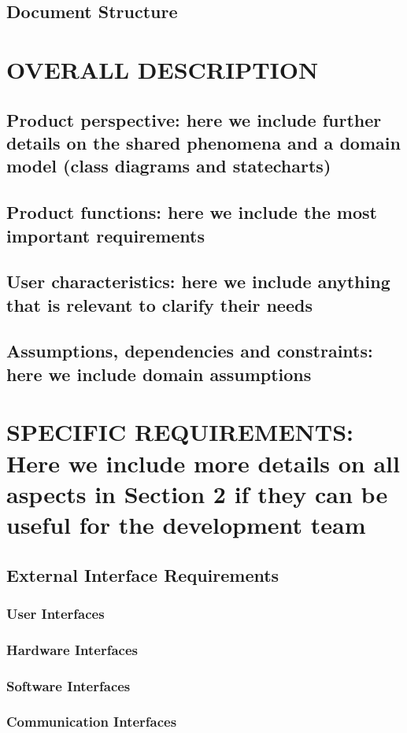 \documentclass[12pt,a4paper]{article}
\begin{document}
\subsection{Document	Structure} 
\section{OVERALL	DESCRIPTION}
\subsection{Product	perspective:	here	we	include	 further	details	on	 the	 shared	phenomena	and	a	
domain	model	(class	diagrams	and	statecharts)} 
\subsection{Product	functions:	here	we	include	the	most	important	requirements} 
\subsection{User	characteristics:	here	we	include	anything	that	is	relevant	to	clarify	their	needs} 
\subsection{Assumptions, dependencies and	constraints:	here	we	include domain	assumptions	} 
\section{SPECIFIC	REQUIREMENTS: Here	we	include	more	details	on	all	aspects	in	Section	2	if	they	
can	be	useful	for	the	development	team}
\subsection{External	Interface	Requirements} 
\subsubsection{User	Interfaces}
\subsubsection{Hardware	Interfaces}
\subsubsection{Software	Interfaces}
\subsubsection{Communication	Interfaces}
\end{document}
